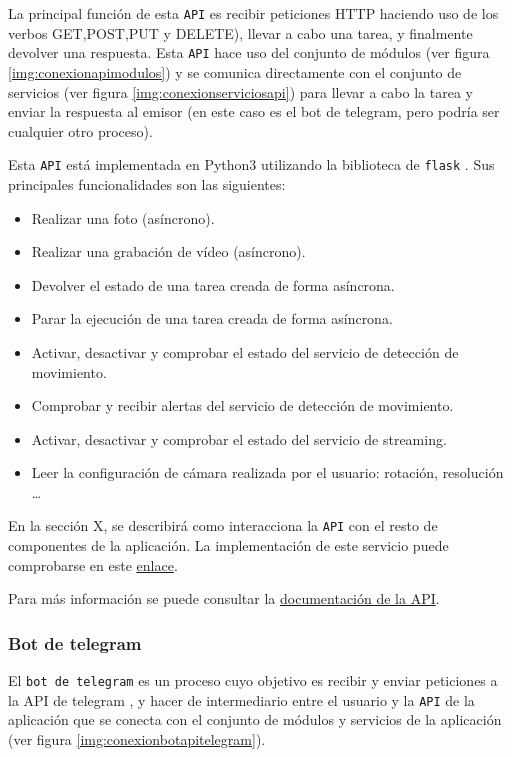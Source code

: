 La principal función de esta \texttt{API} es recibir peticiones HTTP haciendo uso de los verbos GET,POST,PUT y DELETE), llevar a cabo una tarea, y finalmente devolver una respuesta. Esta \texttt{API} hace uso del conjunto de módulos (ver figura \ref{img:conexionapimodulos}) y se comunica directamente con el conjunto de servicios (ver figura \ref{img:conexionserviciosapi}) para llevar a cabo la tarea y enviar la respuesta al emisor (en este caso es el bot de telegram, pero podría ser cualquier otro proceso).

Esta \texttt{API} está implementada en Python3 utilizando la biblioteca de \texttt{flask} \cite{ref14}. Sus principales funcionalidades son las siguientes:

\begin{itemize}
\item Realizar una foto (asíncrono).
\item Realizar una grabación de vídeo (asíncrono).
\item Devolver el estado de una tarea creada de forma asíncrona.
\item Parar la ejecución de una tarea creada de forma asíncrona.
\item Activar, desactivar y comprobar el estado del servicio de detección de movimiento.
\item Comprobar y recibir alertas del servicio de detección de movimiento.
\item Activar, desactivar y comprobar el estado del servicio de streaming.
\item Leer la configuración de cámara realizada por el usuario: rotación, resolución \ldots
\end{itemize}

En la sección X, se describirá como interacciona la \texttt{API} con el resto de componentes de la aplicación. La implementación de este servicio puede comprobarse en este \href{https://github.com/jmv74211/TFM_security_system_PI/blob/master/src/agents/api_agent.py}{enlace}.

Para más información se puede consultar la \href{https://github.com/jmv74211/TFM_security_system_PI/blob/master/doc/api/api_agent_doc.md}{documentación de la API}.

\subsubsection{Bot de telegram}

El \texttt{bot de telegram} es un proceso cuyo objetivo es recibir y enviar peticiones a la API de telegram \cite{ref31}, y hacer de intermediario entre el usuario y la \texttt{API} de la aplicación que se conecta con el conjunto de módulos y servicios de la aplicación (ver figura \ref{img:conexionbotapitelegram}).

